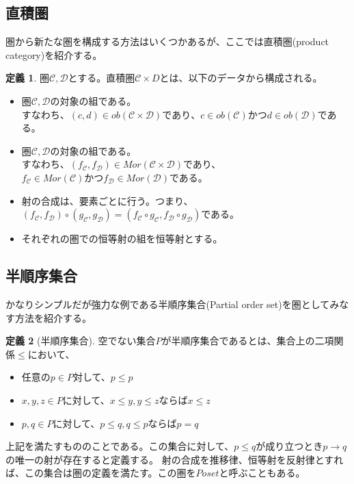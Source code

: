 \documentclass[unicode,12pt,report]{ltjsarticle}
\theoremstyle{definition}
\newtheorem{definition}{定義}[section]
\begin{document}
\subsection{直積圏}
圏から新たな圏を構成する方法はいくつかあるが、ここでは直積圏(product category)を紹介する。
\begin{definition}

  圏$\mathcal C, \mathcal D$とする。直積圏$\mathcal C \times D$とは、以下のデータから構成される。
  \begin{itemize}
    \item [対象] 圏$\mathcal C, \mathcal D$の対象の組である。\\
    すなわち、$(c, d) \in ob(\mathcal C \times \mathcal D)であり、c \in ob(\mathcal C)かつd \in ob(\mathcal D)$である。
    \item [射] 圏$\mathcal C, \mathcal D$の対象の組である。\\
    すなわち、$(f_{\mathcal C}, f_{\mathcal D}) \in Mor(\mathcal C \times \mathcal D)$であり、\\
    $f_{\mathcal C} \in Mor(\mathcal C)$かつ$f_{\mathcal D} \in Mor(\mathcal D)$である。
    \item [合成] 射の合成は、要素ごとに行う。つまり、$(f_{\mathcal C}, f_{\mathcal D}) \circ (g_{\mathcal C}, g_{\mathcal D}) = (f_{\mathcal C} \circ g_{\mathcal C},  f_{\mathcal D} \circ g_{\mathcal D})$である。
    \item [恒等射] それぞれの圏での恒等射の組を恒等射とする。
  \end{itemize}
\end{definition}

\subsection{半順序集合}
かなりシンプルだが強力な例である半順序集合(Partial order set)を圏としてみなす方法を紹介する。
\begin{definition}[半順序集合]
  空でない集合$P$が半順序集合であるとは、集合上の二項関係$\leq$において、
  \begin{itemize}
    \item [反射律] 任意の$p \in P$対して、$p \leq p$
    \item [推移律] $x, y, z\in P$に対して、$x \leq y, y \leq z$ならば$x \leq z$
    \item [反対称律] $p, q \in P$に対して、$p \leq q, q \leq p$ならば$p = q$
  \end{itemize}
  上記を満たすもののことである。この集合に対して、$p \leq q$が成り立つとき$p \to q$の唯一の射が存在すると定義する。
  射の合成を推移律、恒等射を反射律とすれば、この集合は圏の定義を満たす。この圏を$Poset$と呼ぶこともある。
\end{definition}
\end{document}
